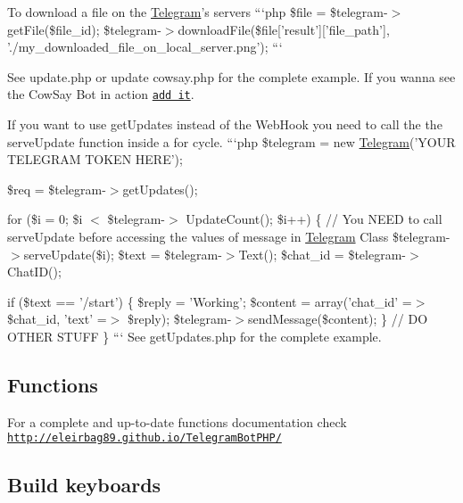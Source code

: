 To download a file on the \hyperlink{class_telegram}{Telegram}'s servers ```php \$file = \$telegram-\/$>$get\-File(\$file\-\_\-id); \$telegram-\/$>$download\-File(\$file\mbox{[}'result'\mbox{]}\mbox{[}'file\-\_\-path'\mbox{]}, './my\-\_\-downloaded\-\_\-file\-\_\-on\-\_\-local\-\_\-server.png'); ```

See update.\-php or update cowsay.\-php for the complete example. If you wanna see the Cow\-Say Bot in action \href{https://telegram.me/cowmooobot}{\tt add it}.

If you want to use get\-Updates instead of the Web\-Hook you need to call the the {\ttfamily serve\-Update} function inside a for cycle. ```php \$telegram = new \hyperlink{class_telegram}{Telegram}('Y\-O\-U\-R T\-E\-L\-E\-G\-R\-A\-M T\-O\-K\-E\-N H\-E\-R\-E');

\$req = \$telegram-\/$>$get\-Updates();

for (\$i = 0; \$i $<$ \$telegram-\/$>$ Update\-Count(); \$i++) \{ // You N\-E\-E\-D to call serve\-Update before accessing the values of message in \hyperlink{class_telegram}{Telegram} Class \$telegram-\/$>$serve\-Update(\$i); \$text = \$telegram-\/$>$Text(); \$chat\-\_\-id = \$telegram-\/$>$Chat\-I\-D();

if (\$text == '/start') \{ \$reply = 'Working'; \$content = array('chat\-\_\-id' =$>$ \$chat\-\_\-id, 'text' =$>$ \$reply); \$telegram-\/$>$send\-Message(\$content); \} // D\-O O\-T\-H\-E\-R S\-T\-U\-F\-F \} ``` See get\-Updates.\-php for the complete example.

\subsection*{Functions }

For a complete and up-\/to-\/date functions documentation check \href{http://eleirbag89.github.io/TelegramBotPHP/}{\tt http\-://eleirbag89.\-github.\-io/\-Telegram\-Bot\-P\-H\-P/}

\subsection*{Build keyboards }

